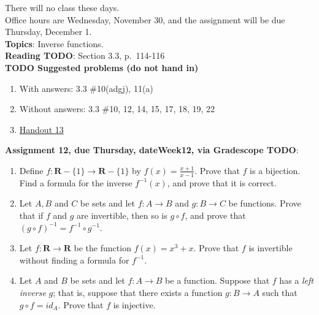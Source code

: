 \documentclass[12pt]{article}
\begin{document}
\noindent There will no class these days.
\\

\noindent Office hours are Wednesday, November 30, and the assignment will be due Thursday, December 1.
\\

\noindent \textbf{Topics}: Inverse functions.
\\

\noindent \textbf{Reading TODO}: Section 3.3, p.~114-116
\\

\noindent \textbf{TODO Suggested problems (do not hand in)}

\begin{enumerate}
\item With answers: 3.3 \#10(adgj), 11(a)
\item Without answers: 3.3 \#10, 12, 14, 15, 17, 18, 19, 22
\item \href{https://www.math.emory.edu/~dzb/teaching/250Fall2021/handouts/250-H13-inverses.pdf}{Handout 13}
\end{enumerate}

\noindent \textbf{Assignment 12, due Thursday, \csname dateWeek12\endcsname, via Gradescope TODO}:
\begin{enumerate}
\item Define $f \colon \mathbf{R}-\{1\} \to \mathbf{R} - \{1\}$ by $f(x) = \frac{x+1}{x-1}$. Prove that $f$ is a bijection. Find a formula for the inverse $f^{-1}(x)$, and prove that it is correct.
\item Let $A, B$ and $C$ be sets and let $f \colon A \to B$ and $g \colon B \to C$ be functions. Prove that if $f$ and $g$ are invertible, then so is $g \circ f$, and prove that $(g \circ f)^{-1} = f^{-1} \circ g^{-1}$.
\item Let $f \colon \mathbf{R} \to \mathbf{R}$ be the function $f(x) = x^3 + x$. Prove that $f$ is invertible without finding a formula for $f^{-1}$.
\item Let $A$ and $B$ be sets and let $f \colon A \to B$ be a function. Suppose that $f$ has a \emph{left inverse} $g$; that is, suppose that there exists a function $g \colon B \to A$ such that $g \circ f = id_A$. Prove that $f$ is injective.
\end{enumerate}

\newpage
\end{document}
